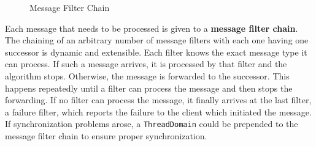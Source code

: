 \begin{figure}[H]
 \centering
 \caption{Message Filter Chain}
 \label{fig:network.discovery.messagefilterchain.concept}
\end{figure}

Each message that needs to be processed is given to a \textbf{message filter chain}. The chaining of an arbitrary number of message filters with each one having one successor is dynamic and extensible. Each filter knows the exact message type it can process. If such a message arrives, it is processed by that filter and the algorithm stops. Otherwise, the message is forwarded to the successor. This happens repeatedly until a filter can process the message and then stops the forwarding. If no filter can process the message, it finally arrives at the last filter, a failure filter, which reports the failure to the client which initiated the message. If synchronization problems arose, a \texttt{ThreadDomain} could be prepended to the message filter chain to ensure proper synchronization.

